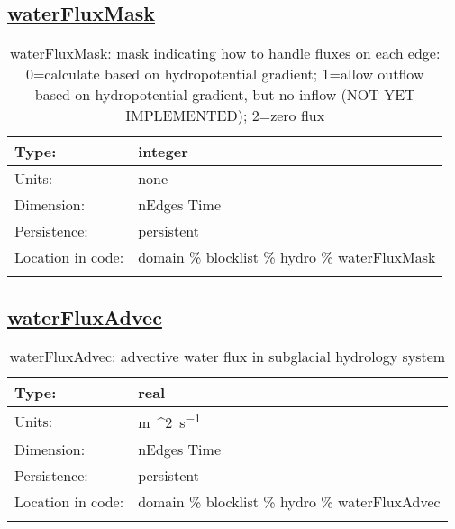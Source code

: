 \subsection[waterFluxMask]{\hyperref[sec:var_tab_hydro]{waterFluxMask}}
\label{subsec:var_sec_hydro_waterFluxMask}
\begin{center}
\begin{longtable}{| p{2.0in} | p{4.0in} |}
        \hline 
        Type: & integer \\
        \hline 
        Units: & \si{none} \\
        \hline 
        Dimension: & nEdges Time \\
        \hline 
        Persistence: & persistent \\
        \hline 
         Location in code: & domain \% blocklist \% hydro \% waterFluxMask \\
         \hline 
    \caption{waterFluxMask: mask indicating how to handle fluxes on each edge: 0=calculate based on hydropotential gradient; 1=allow outflow based on hydropotential gradient, but no inflow (NOT YET IMPLEMENTED); 2=zero flux}
\end{longtable}
\end{center}
\subsection[waterFluxAdvec]{\hyperref[sec:var_tab_hydro]{waterFluxAdvec}}
\label{subsec:var_sec_hydro_waterFluxAdvec}
\begin{center}
\begin{longtable}{| p{2.0in} | p{4.0in} |}
        \hline 
        Type: & real \\
        \hline 
        Units: & \si{m{^2}.s^{-1}} \\
        \hline 
        Dimension: & nEdges Time \\
        \hline 
        Persistence: & persistent \\
        \hline 
         Location in code: & domain \% blocklist \% hydro \% waterFluxAdvec \\
         \hline 
    \caption{waterFluxAdvec: advective water flux in subglacial hydrology system}
\end{longtable}
\end{center}
